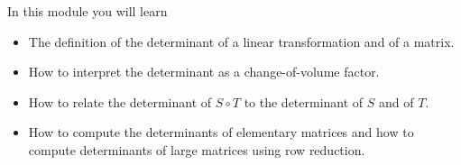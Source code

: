 \begin{module}

	In this module you will learn
	\begin{itemize}
		\item The definition of the determinant of a linear transformation and of a matrix.
		\item How to interpret the determinant as a change-of-volume factor.
		\item How to relate the determinant of $S\circ T$ to the determinant of $S$ and
			of $T$.
		\item How to compute the determinants of elementary matrices and how to compute determinants
			of large matrices using row reduction.
	\end{itemize}

	
	
\end{module}
